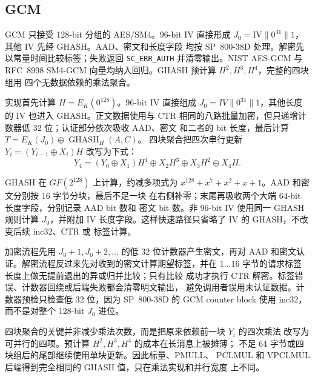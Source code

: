 \documentclass[11pt,a4paper,UTF8,fontset=none]{ctexart}
\begin{document}
\subsection{GCM}

GCM 只接受 128-bit 分组的 AES/SM4。96-bit IV 直接形成
$J_0=\mathrm{IV}\|0^{31}\|1$，其他 IV 先经 GHASH。AAD、密文和长度字段
均按 SP~800-38D 处理。解密先以常量时间比较标签；失败返回
\texttt{SC\_ERR\_AUTH} 并清零输出。NIST AES-GCM 与 RFC~8998
SM4-GCM 向量均纳入回归。GHASH 预计算 $H^2,H^3,H^4$，完整的四块组用
四个无数据依赖的乘法聚合。

实现首先计算 \(H=E_K(0^{128})\)。96-bit IV 直接组成
\(J_0=IV\|0^{31}\|1\)，其他长度的 IV 也进入 GHASH。正文数据使用与 CTR
相同的八路批量加密，但只递增计数器低 32 位；认证部分依次吸收 AAD、密文
和二者的 bit 长度，最后计算
\(T=E_K(J_0)\oplus\operatorname{GHASH}_H(A,C)\)。
四块聚合把四次串行更新
\(Y_i=(Y_{i-1}\oplus X_i)H\) 改写为下式：
\[
Y_4=(Y_0\oplus X_1)H^4\oplus X_2H^3\oplus X_3H^2\oplus X_4H .
\]

GHASH 在 \(GF(2^{128})\) 上计算，约减多项式为
\(x^{128}+x^7+x^2+x+1\)。AAD 和密文分别按 16 字节分块，最后不足一块
在右侧补零；末尾再吸收两个大端 64-bit 长度字段，分别记录 AAD bit 数和
密文 bit 数。非 96-bit IV 使用同一 GHASH 规则计算 \(J_0\)，并附加 IV
长度字段。这样快速路径只省略了 IV 的 GHASH，不改变后续 inc32、CTR 或
标签计算。

加密流程先用 \(J_0+1,J_0+2,\ldots\) 的低 32 位计数器产生密文，再对
AAD 和密文认证。解密流程反过来先对收到的密文计算期望标签，并在
\(1\ldots16\) 字节的请求标签长度上做无提前退出的异或归并比较；只有比较
成功才执行 CTR 解密。标签错误、计数器回绕或后端失败都会清零明文输出，
避免调用者误用未认证数据。计数器预检只检查低 32 位，因为 SP~800-38D 的
GCM counter block 使用 inc32，而不是对整个 128-bit \(J_0\) 进位。

四块聚合的关键并非减少乘法次数，而是把原来依赖前一块 \(Y_i\) 的四次乘法
改写为可并行的四项。预计算 \(H^2,H^3,H^4\) 的成本在长消息上被摊薄；
不足 64 字节或四块组后的尾部继续使用单块更新。因此标量、PMULL、
PCLMUL 和 VPCLMUL 后端得到完全相同的 GHASH 值，只在乘法实现和并行宽度
上不同。
\end{document}
